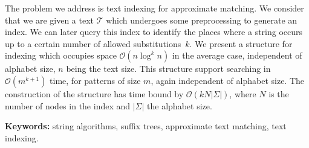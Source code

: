 The problem we address is text indexing for approximate matching. We consider that we are given a text $\mathcal{T}$ which undergoes some preprocessing to generate an index. We can later query this index to identify the places where a string occurs up to a certain number of allowed substitutions~$k$. We present a structure for indexing which occupies space $\mathcal{O}(n\log^kn)$ in the average case, independent of alphabet size, $n$ being the text size. This structure support searching in $\mathcal{O}(m^{k+1})$ time, for patterns of size $m$, again independent of alphabet size. The construction of the structure has time bound by $\mathcal{O}(kN|\Sigma|)$, where $N$ is the number of nodes in the index and $|\Sigma|$ the alphabet size.

\textbf{Keywords:} string algorithms, suffix trees, approximate text matching, text indexing.
